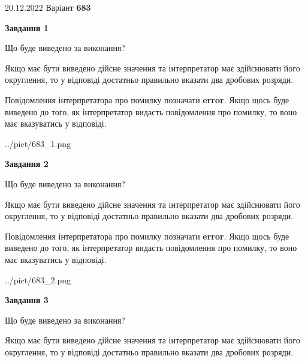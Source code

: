 \documentclass[12pt, ukrainian]{article}
\begin{document}
{20.12.2022 Варіант \No \textbf { 683 }\par}
{
\begin {Large}

{\begin {center}\textbf{Завдання 1}\end {center}}\par
Що буде виведено за виконання? \par

Якщо має бути виведено дійсне значення та інтерпретатор має здійснювати його округлення, 
то у відповіді достатньо правильно вказати два дробових розряди.

Повідомлення інтерпретатора про помилку позначати \textbf{error}.
Якщо щось буде виведено до того, як інтерпретатор видасть повідомлення про помилку, 
то воно має вказуватись у відповіді. \par

\begin{center}
	{../pict/683_1.png}
\end{center}
\newpage

{\begin {center}\textbf{Завдання 2}\end {center}}\par
Що буде виведено за виконання? \par

Якщо має бути виведено дійсне значення та інтерпретатор має здійснювати його округлення, 
то у відповіді достатньо правильно вказати два дробових розряди.

Повідомлення інтерпретатора про помилку позначати \textbf{error}.
Якщо щось буде виведено до того, як інтерпретатор видасть повідомлення про помилку, 
то воно має вказуватись у відповіді. \par

\begin{center}
	{../pict/683_2.png}
\end{center}
\newpage

{\begin {center}\textbf{Завдання 3}\end {center}}\par
Що буде виведено за виконання? \par

Якщо має бути виведено дійсне значення та інтерпретатор має здійснювати його округлення, 
то у відповіді достатньо правильно вказати два дробових розряди.


\end{Large}}
\end{document}
